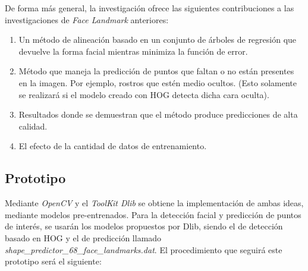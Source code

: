 De forma más general, la investigación ofrece las siguientes contribuciones a las investigaciones de \textit{Face Landmark} anteriores:

\begin{enumerate}
	\vspace{-0.2cm}
	\item Un método de alineación basado en un conjunto de árboles de regresión que devuelve la forma facial mientras minimiza la función de error.
	\vspace{-0.2cm}
	\item Método que maneja la predicción de puntos que faltan o no están presentes en la imagen. Por ejemplo, rostros que estén medio ocultos. (Esto solamente se realizará si el modelo creado con HOG detecta dicha cara oculta).
	\vspace{-0.2cm}
	\item Resultados donde se demuestran que el método produce predicciones de alta calidad.
	\vspace{-0.2cm}
	\item El efecto de la cantidad de datos de entrenamiento.
\end{enumerate}

\vspace{-0.8cm}
\subsection*{Prototipo}
\vspace{-0.5cm}
Mediante \textit{OpenCV} y el \textit{ToolKit Dlib} se obtiene la implementación de ambas ideas, mediante modelos pre-entrenados. Para la detección facial y predicción de puntos de interés, se usarán los modelos propuestos por Dlib, siendo el de detección basado en HOG y el de predicción llamado \textit{shape\_predictor\_68\_face\_landmarks.dat}. El procedimiento que seguirá este prototipo será el siguiente:

